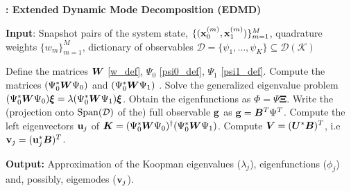 \begin{algorithm}
\caption{\textbf{: Extended Dynamic Mode Decomposition (EDMD)}}
\label{alg_edmd}
\textbf{Input}: Snapshot pairs of the system state, $\{(\vb{x}_0^{(m)}, \vb{x}_1^{(m)})\}_{m = 1}^M$, quadrature weights $\{w_m\}_{m = 1}^M$, dictionary of observables $\mathcal{D} = \{\psi_1, \dots, \psi_K\} \subseteq \mathcal{D}(\mathcal{K})$
\begin{algorithmic}[1]
\State Define the matrices $\vb*{W}$ \eqref{w_def}, $\Psi_0$ \eqref{psi0_def}, $\Psi_1$ \eqref{psi1_def}. 
\State Compute the matrices $(\Psi_0^*\vb*{W}\Psi_0)$ and $(\Psi_0^*\vb*{W}\Psi_1)$ .
\State Solve the generalized eigenvalue problem $(\Psi_0^*\vb*{W}\Psi_0)\bm{\xi} = \lambda(\Psi_0^*\vb*{W}\Psi_1)\bm{\xi}$.
\State Obtain the eigenfunctions as $\Phi = \Psi\bm{\Xi}$.
    \State Write the (projection onto $\mathrm{Span}(\mathcal{D})$ of the) full observable $\vb{g}$ as $\vb{g} = \vb*{B}^T\Psi^T$.
    \State Compute the left eigenvectors $\vb{u}_j$ of $\vb*{K} = (\Psi_0^*\vb*{W}\Psi_0)^{\dagger}(\Psi_0^*\vb*{W}\Psi_1)$.
    \State Compute $\vb*{V} = (\vb*{U}^*\vb*{B})^T$, i.e $\vb{v}_j = (\vb{u}_j^*\vb*{B})^T$.
\EndIf
\end{algorithmic}
\textbf{Output:} Approximation of the Koopman eigenvalues ($\lambda_j$), eigenfunctions ($\phi_j$) and, possibly, eigemodes ($\vb{v}_j$).
\end{algorithm}


